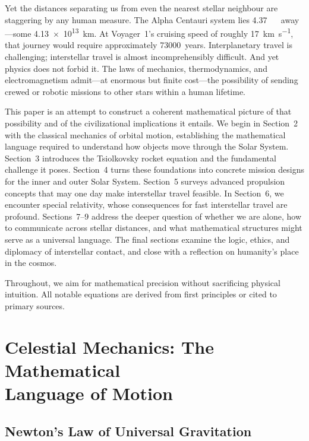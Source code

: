 \documentclass[12pt,a4paper]{article}
\newcommand{\ly}{\,\text{ly}}
\begin{document}
Yet the distances separating us from even the nearest stellar neighbour are
staggering by any human measure. The Alpha Centauri system lies
\SI{4.37}{\ly}~away---some \SI{4.13e13}{\kilo\meter}. At Voyager~1's
cruising speed of roughly \SI{17}{\kilo\meter\per\second}, that journey
would require approximately \num{73000}~years. Interplanetary travel is
challenging; interstellar travel is almost incomprehensibly difficult. And yet
physics does not forbid it. The laws of mechanics, thermodynamics, and
electromagnetism admit---at enormous but finite cost---the possibility of
sending crewed or robotic missions to other stars within a human lifetime.

This paper is an attempt to construct a coherent mathematical picture of that
possibility and of the civilizational implications it entails. We begin in
Section~2 with the classical mechanics of orbital motion, establishing the
mathematical language required to understand how objects move through the Solar
System. Section~3 introduces the Tsiolkovsky rocket equation and the
fundamental challenge it poses. Section~4 turns these foundations into concrete
mission designs for the inner and outer Solar System. Section~5 surveys advanced
propulsion concepts that may one day make interstellar travel feasible. In
Section~6, we encounter special relativity, whose consequences for fast
interstellar travel are profound. Sections~7--9 address the deeper question of
whether we are alone, how to communicate across stellar distances, and what
mathematical structures might serve as a universal language. The final sections
examine the logic, ethics, and diplomacy of interstellar contact, and close with
a reflection on humanity's place in the cosmos.

Throughout, we aim for mathematical precision without sacrificing physical
intuition. All notable equations are derived from first principles or cited to
primary sources.

\section[Celestial Mechanics: The Mathematical Language of Motion]{Celestial Mechanics: The Mathematical\\Language of Motion}

\subsection{Newton's Law of Universal Gravitation}
\end{document}
